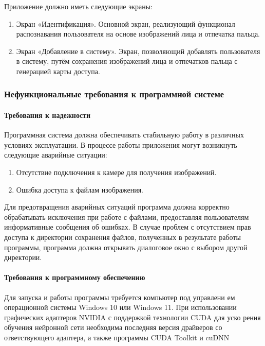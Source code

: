  Приложение должно иметь следующие экраны:
 
 \begin{enumerate}
 	\item Экран «Идентификация». Основной экран, реализующий функционал распознавания пользователя на основе изображений лица и отпечатка пальца.
 	\item Экран «Добавление в систему». Экран, позволяющий добавлять пользователя в систему, путём сохранения изображений лица и отпечатков пальца с генерацией карты доступа.
 \end{enumerate}


\subsubsection{Нефункциональные требования к программной системе}

\paragraph {Требования к надежности}

Программная система должна обеспечивать стабильную работу в различных условиях эксплуатации. В процессе работы приложения могут возникнуть следующие аварийные ситуации:
\begin{enumerate}
	\item Отсутствие подключения к камере для получения изображений.
	\item Ошибка доступа к файлам изображения.
\end{enumerate}

Для предотвращения аварийных ситуаций программа должна корректно обрабатывать исключения при работе с файлами, предоставляя пользователям информативные сообщения об ошибках. В случае проблем с отсутствием прав доступа к директории сохранения файлов, полученных в результате работы программы, программа должна открывать диалоговое окно с выбором другой директории.

\paragraph {Требования к программному обеспечению}

Для запуска и работы программы требуется компьютер под управлени
ем операционной системы Windows 10 или Windows 11. При использовании
графических адаптеров NVIDIA с поддержкой технологии CUDA для уско
рения обучения нейронной сети необходима последняя версия драйверов со
ответствующего адаптера, а также программы CUDA Toolkit и cuDNN

